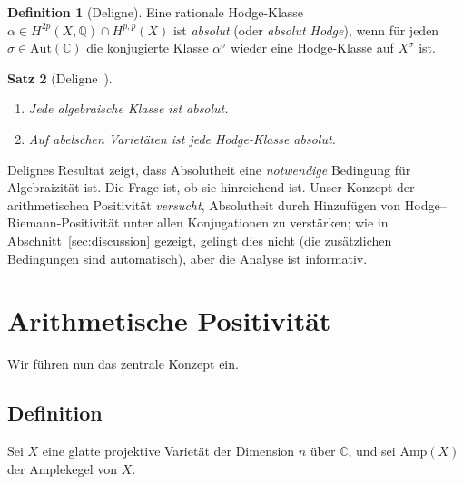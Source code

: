 \documentclass[aps,prd,twocolumn,superscriptaddress,nofootinbib]{revtex4-2}
\newtheorem{theorem}{Satz}[section]
\theoremstyle{definition}
\newtheorem{definition}[theorem]{Definition}
\theoremstyle{remark}
\begin{document}
\begin{definition}[Deligne]
\label{def:absolute}
Eine rationale Hodge-Klasse $\alpha \in H^{2p}(X, \mathbb{Q}) \cap H^{p,p}(X)$ ist \textit{absolut} (oder \textit{absolut Hodge}), wenn für jeden $\sigma \in \mathrm{Aut}(\mathbb{C})$ die konjugierte Klasse $\alpha^\sigma$ wieder eine Hodge-Klasse auf $X^\sigma$ ist.
\end{definition}

\begin{theorem}[Deligne~\cite{Deligne1982}]
\label{thm:deligne_absolute}
\begin{enumerate}
\item Jede algebraische Klasse ist absolut.
\item Auf abelschen Varietäten ist jede Hodge-Klasse absolut.
\end{enumerate}
\end{theorem}

Delignes Resultat zeigt, dass Absolutheit eine \textit{notwendige} Bedingung für Algebraizität ist. Die Frage ist, ob sie hinreichend ist. Unser Konzept der arithmetischen Positivität \textit{versucht}, Absolutheit durch Hinzufügen von Hodge--Riemann-Positivität unter allen Konjugationen zu verstärken; wie in Abschnitt~\ref{sec:discussion} gezeigt, gelingt dies nicht (die zusätzlichen Bedingungen sind automatisch), aber die Analyse ist informativ.


\section{Arithmetische Positivität}
\label{sec:arithmetic_positivity}

Wir führen nun das zentrale Konzept ein.

\subsection{Definition}

Sei $X$ eine glatte projektive Varietät der Dimension $n$ über $\mathbb{C}$, und sei $\mathrm{Amp}(X)$ der Amplekegel von $X$.
\end{document}
